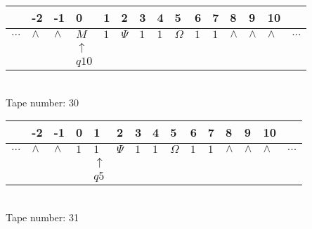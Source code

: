 \documentclass{article}
\begin{document}
\begin{table}[H]
\centering
\begin{tabular}{lllllllllllllll}
 & -2 & -1 & 0 & 1 & 2 & 3 & 4 & 5 & 6 & 7 & 8 & 9 & 10 & \\
\hline
$...$ & \multicolumn{1}{|l|}{$\wedge$} & \multicolumn{1}{|l|}{$\wedge$} & \multicolumn{1}{|l|}{$M$} & \multicolumn{1}{|l|}{$1$} & \multicolumn{1}{|l|}{$\Psi$} & \multicolumn{1}{|l|}{$1$} & \multicolumn{1}{|l|}{$1$} & \multicolumn{1}{|l|}{$\Omega$} & \multicolumn{1}{|l|}{$1$} & \multicolumn{1}{|l|}{$1$} & \multicolumn{1}{|l|}{$\wedge$} & \multicolumn{1}{|l|}{$\wedge$} & \multicolumn{1}{|l|}{$\wedge$} & $...$\\
\hline
&  &  & $\uparrow$ &  &  &  &  &  &  &  &  &  &  &  \\
&  &  & $ q10 $ &  &  &  &  &  &  &  &  &  &  &  \\
\end{tabular}
\\
Tape number: 30
\noindent\makebox[\linewidth]{\hdashrule{\textwidth}{1pt}{1pt}}\end{table}

\begin{table}[H]
\centering
\begin{tabular}{lllllllllllllll}
 & -2 & -1 & 0 & 1 & 2 & 3 & 4 & 5 & 6 & 7 & 8 & 9 & 10 & \\
\hline
$...$ & \multicolumn{1}{|l|}{$\wedge$} & \multicolumn{1}{|l|}{$\wedge$} & \multicolumn{1}{|l|}{$1$} & \multicolumn{1}{|l|}{$1$} & \multicolumn{1}{|l|}{$\Psi$} & \multicolumn{1}{|l|}{$1$} & \multicolumn{1}{|l|}{$1$} & \multicolumn{1}{|l|}{$\Omega$} & \multicolumn{1}{|l|}{$1$} & \multicolumn{1}{|l|}{$1$} & \multicolumn{1}{|l|}{$\wedge$} & \multicolumn{1}{|l|}{$\wedge$} & \multicolumn{1}{|l|}{$\wedge$} & $...$\\
\hline
&  &  &  & $\uparrow$ &  &  &  &  &  &  &  &  &  &  \\
&  &  &  & $ q5 $ &  &  &  &  &  &  &  &  &  &  \\
\end{tabular}
\\
Tape number: 31
\noindent\makebox[\linewidth]{\hdashrule{\textwidth}{1pt}{1pt}}\end{table}
\end{document}
